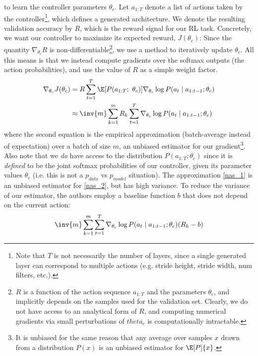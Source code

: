 \documentclass[11pt]{article}
\begin{document}
\myspace
\p {} to learn the controller parameters $\theta_c$. Let $a_{1:T}$ denote a list of actions taken by the controller\footnote{Note that $T$ is not necessarily the number of layers, since a single generated layer can correspond to multiple actions (e.g. stride height, stride width, num filters, etc.).}, which defines a generated architecture. We denote the resulting validation accuracy by $R$, which is the reward signal for our RL task. Concretely, we want our controller to maximize its expected reward, $J(\theta_c)$:
Since the quantity $\nabla_{\theta_c} R$ is non-differentiable\footnote{$R$ is a function of the action sequence $a_{1:T}$ and the parameters $\theta_c$, and implicitly depends on the samples used for the validation set. Clearly, we do not have access to an analytical form of $R$, and computing numerical gradients via small perturbations of $theta_c$ is computationally intractable.}, we use a  method to iteratively update $\theta_c$. All this means is that we instead compute gradients over the softmax outputs (the action probabilities), and use the value of $R$ as a simple weight factor.
\begin{align}
	\nabla_{\theta_c} J(\theta_c) 
	&= R \sum_{t = 1}^{T}   \E[P(a_{1:T};~ \theta_c)]{ \nabla_{\theta_c} \log P(a_t \mid a_{1:t-1}; \theta_c) }	\label{nas_1} \\
	&\approx \inv{m} \sum_{k = 1}^{m} R_k \sum_{t = 1}^{T} \nabla_{\theta_c} \log P(a_t \mid a_{1:t-1}; \theta_c) \label{nas_2}
\end{align}
where the second equation is the empirical approximation (batch-average instead of expectation) over a batch of size $m$, an unbiased estimator for our gradient\footnote{It is unbiased for the same reason that any average over samples $x$ drawn from a distribution $P(x)$ is an unbiased estimator for $\E[P]{x}$.}. Also note that we \textit{do} have access to the distribution $P(a_{1:T}; \theta_c)$ since it is \textit{defined} to be the joint softmax probabilities of our controller, given its parameter values $\theta_c$ (i.e. this is not a $p_{data}$ vs $p_{model}$ situation). The approximation \ref{nas_1} is an unbiased estimator for \ref{nas_2}, but has high variance. To reduce the variance of our estimator, the authors employ a baseline function $b$ that does not depend on the current action:
\begin{align}
 \inv{m} \sum_{k = 1}^{m} \sum_{t = 1}^{T} \nabla_{\theta_c} \log P(a_t \mid a_{1:t-1}; \theta_c) (R_k - b)
\end{align}
\end{document}
